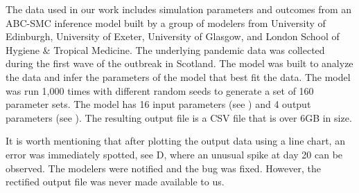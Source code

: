 The data used in our work includes simulation parameters and outcomes from an ABC-SMC inference model \cite{toni2008Approximate} built by a group of modelers from University of Edinburgh, University of Exeter, University of Glasgow, and London School of Hygiene \& Tropical Medicine. The underlying pandemic data was collected during the first wave of the outbreak in Scotland. The model was built to analyze the data and infer the parameters of the model that best fit the data. The model was run 1,000 times with different random seeds to generate a set of 160 parameter sets. The model has 16 input parameters (see ) and 4 output parameters (see ). The resulting output file is a CSV file that is over 6GB in size.

It is worth mentioning that after plotting the output data using a line chart, an error was immediately spotted, see D, where an unusual spike at day 20 can be observed. The modelers were notified and the bug was fixed. However, the rectified output file was never made available to us.
